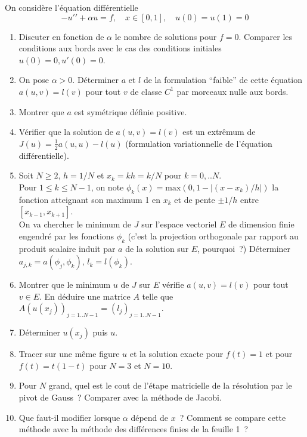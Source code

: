 \documentclass[10pt,a4paper]{article}
\begin{document}
On consid\`ere l'\'equation diff\'erentielle 
$$ -u'{'}+\alpha u=f, \quad x \in [0,1], \quad u(0)=u(1)=0 $$
\begin{enumerate}
\item Discuter en fonction de $\alpha$ le nombre de solutions pour
  $f=0$. Comparer les conditions aux bords
avec le cas des conditions initiales $u(0)=0, u'(0)=0$.
\item On pose $\alpha>0$.
 D\'eterminer $a$ et $l$ de la formulation ``faible'' de cette \'equation
$ a(u,v)=l(v)$ pour tout $v$ de classe $C^1$ par morceaux nulle aux
bords.
\item Montrer que $a$ est sym\'etrique d\'efinie positive.
\item V\'erifier que la solution de $a(u,v)=l(v)$ est un extr\^emum
de  $J(u)=\frac12 a(u,u)-l(u)$ (formulation variationnelle de
l'\'equation diff\'erentielle).
\item Soit $N\geq2$, $h=1/N$ et $x_k=kh=k/N$ pour $k=0,..N$.\\
Pour $1\leq k \leq N-1$, on 
note $\phi_k(x)=\mbox{max}(0,1-|(x-x_k)/h|)$ la fonction 
atteignant son maximum 1 en $x_k$ et de
pente $\pm 1/h$ entre $[x_{k-1},x_{k+1}]$.\\
On va chercher le minimum de $J$ sur l'espace vectoriel
$E$ de dimension finie engendr\'e par les fonctions $\phi_k$
(c'est la projection orthogonale par rapport au produit scalaire 
induit par $a$ de la solution sur $E$, pourquoi~?)
D\'eterminer $a_{j,k}=a(\phi_j,\phi_k)$, $l_k=l(\phi_k)$.
\item Montrer que le minimum $u$ de $J$ sur $E$ v\'erifie $a(u,v)=l(v)$ pour
tout $v \in E$. En d\'eduire une matrice $A$ telle que
$A(u(x_j))_{j=1..N-1}=(l_j)_{j=1..N-1}$.
\item D\'eterminer $u(x_j)$ puis $u$.
\item Tracer sur une m\^eme figure $u$ et la solution exacte
pour $f(t)=1$ et pour $f(t)=t(1-t)$ pour $N=3$ et $N=10$.
\item Pour $N$ grand, quel est le cout de l'\'etape matricielle de la r\'esolution
par le pivot de Gauss~? Comparer avec la m\'ethode de Jacobi.
\item Que faut-il modifier lorsque $\alpha$ d\'epend de $x$~?
Comment se compare cette m\'ethode avec la m\'ethode des diff\'erences
finies de la feuille 1~?
\end{enumerate}

\eexer
\end{document}
